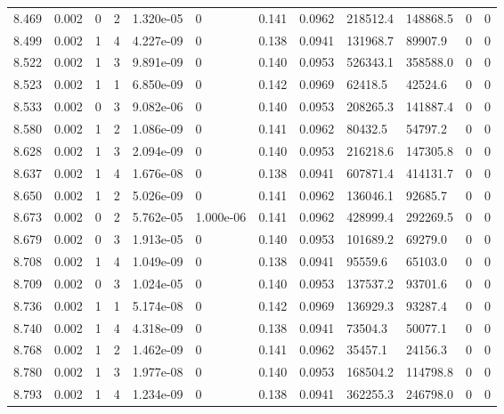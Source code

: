 \documentclass[preview]{standalone}
\begin{document}
{{{{{{{{{{{{\begin{tabular}{L{1.2cm}C{1.2cm} C{0.3cm}C{0.5cm} C{1.4cm}C{1.4cm} C{1.4cm}C{1.4cm} C{1.6cm}C{1.6cm} C{1.6cm}C{1.6cm}}
  8.469  &  0.002  & 0     &  2 &  1.320e-05  & 0  &  0.141&   0.0962& 218512.4 & 148868.5   &  0 & 0  \\ 
  8.499  &  0.002  & 1     &  4 &  4.227e-09  & 0  &  0.138&   0.0941& 131968.7 & 89907.9   &  0 & 0  \\ 
  8.522  &  0.002  & 1     &  3 &  9.891e-09  & 0  &  0.140&   0.0953& 526343.1 & 358588.0   &  0 & 0  \\ 
  8.523  &  0.002  & 1     &  1 &  6.850e-09  & 0  &  0.142&   0.0969& 62418.5 & 42524.6   &  0 & 0  \\ 
  8.533  &  0.002  & 0     &  3 &  9.082e-06  & 0  &  0.140&   0.0953& 208265.3 & 141887.4   &  0 & 0  \\ 
  8.580  &  0.002  & 1     &  2 &  1.086e-09  & 0  &  0.141&   0.0962& 80432.5 & 54797.2   &  0 & 0  \\ 
  8.628  &  0.002  & 1     &  3 &  2.094e-09  & 0  &  0.140&   0.0953& 216218.6 & 147305.8   &  0 & 0  \\ 
  8.637  &  0.002  & 1     &  4 &  1.676e-08  & 0  &  0.138&   0.0941& 607871.4 & 414131.7   &  0 & 0  \\ 
  8.650  &  0.002  & 1     &  2 &  5.026e-09  & 0  &  0.141&   0.0962& 136046.1 & 92685.7   &  0 & 0  \\ 
  8.673  &  0.002  & 0     &  2 &  5.762e-05  & 1.000e-06  &  0.141&   0.0962& 428999.4 & 292269.5   &  0 & 0  \\ 
  8.679  &  0.002  & 0     &  3 &  1.913e-05  & 0  &  0.140&   0.0953& 101689.2 & 69279.0   &  0 & 0  \\ 
  8.708  &  0.002  & 1     &  4 &  1.049e-09  & 0  &  0.138&   0.0941& 95559.6 & 65103.0   &  0 & 0  \\ 
  8.709  &  0.002  & 0     &  3 &  1.024e-05  & 0  &  0.140&   0.0953& 137537.2 & 93701.6   &  0 & 0  \\ 
  8.736  &  0.002  & 1     &  1 &  5.174e-08  & 0  &  0.142&   0.0969& 136929.3 & 93287.4   &  0 & 0  \\ 
  8.740  &  0.002  & 1     &  4 &  4.318e-09  & 0  &  0.138&   0.0941& 73504.3 & 50077.1   &  0 & 0  \\ 
  8.768  &  0.002  & 1     &  2 &  1.462e-09  & 0  &  0.141&   0.0962& 35457.1 & 24156.3   &  0 & 0  \\ 
  8.780  &  0.002  & 1     &  3 &  1.977e-08  & 0  &  0.140&   0.0953& 168504.2 & 114798.8   &  0 & 0  \\ 
  8.793  &  0.002  & 1     &  4 &  1.234e-09  & 0  &  0.138&   0.0941& 362255.3 & 246798.0   &  0 & 0  \\ 

\end{tabular}}}}}}}}}}}}}
\end{document}
